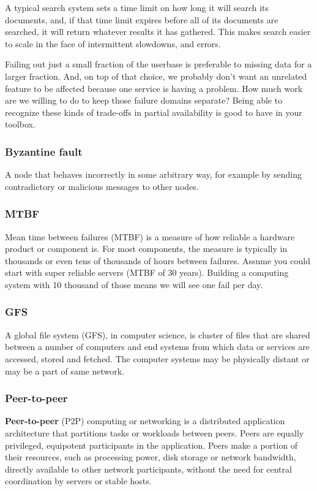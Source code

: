 \documentclass{article}
\begin{document}
    A typical search system sets a time limit on how long it will search its documents, and, if that time limit expires before all of its documents are searched, it will return whatever results it has gathered. This makes search easier to scale in the face of intermittent slowdowns, and errors.
     
    Failing out just a small fraction of the userbase is preferable to missing data for a larger fraction. And, on top of that choice, we probably don’t want an unrelated feature to be affected because one service is having a problem. How much work are we willing to do to keep those failure domains separate? Being able to recognize these kinds of trade-offs in partial availability is good to have in your toolbox.

    \subsubsection{Byzantine fault}
    A node that behaves incorrectly in some arbitrary way, for example by sending contradictory or malicious messages to other nodes.
    
    \subsubsection{MTBF}
    Mean time between failures (MTBF)  is a measure of how reliable a hardware product or component is. For most components, the measure is typically in thousands or even tens of thousands of hours between failures.
    Assume you could start with super reliable servers (MTBF of 30 years). Building a computing system with 10 thousand of those means we will see one fail per day.

    \subsubsection{GFS}
    A global file system (GFS), in computer science, is cluster of files that are shared between a number of computers and end systems from which data or services are accessed, stored and fetched. The computer systems may be physically distant or may be a part of same network.
    
    \subsubsection{Peer-to-peer}
    \textbf{Peer-to-peer} (P2P) computing or networking is a distributed application architecture that partitions tasks or workloads between peers. Peers are equally privileged, equipotent participants in the application. Peers make a portion of their resources, such as processing power, disk storage or network bandwidth, directly available to other network participants, without the need for central coordination by servers or stable hosts.
    
\end{document}
